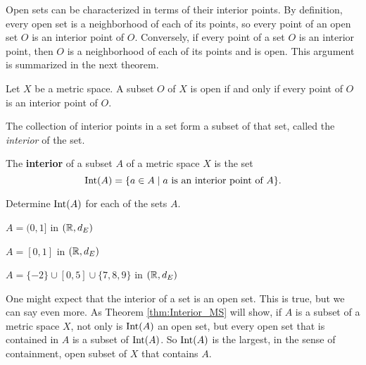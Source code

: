 
Open sets can be characterized in terms of their interior points. By definition, every open set is a neighborhood of each of its points, so every point of an open set $O$ is an interior point of $O$. Conversely, if every point of a set $O$ is an interior point, then $O$ is a neighborhood of each of its points and is open. This argument is summarized in the next theorem. 

\begin{theorem} Let $X$ be a metric space. A subset $O$ of $X$ is open if and only if every point of $O$ is an interior point of $O$. 
\end{theorem}

The collection of interior points in a set form a subset of that set, called the \emph{interior} of the set.

\begin{definition} The \textbf{interior} of a subset $A$ of a metric space $X$ is the set
\[\text{Int}(A) = \{a \in A \mid a \text{ is an interior point of } A\}.\]
\end{definition}

\begin{activity} Determine $\text{Int}(A)$ for each of the sets $A$.
\ba
\item $A = (0,1]$ in $(\mathbb{R}, d_E)$

\item $A = [0,1]$ in $(\mathbb{R}, d_E)$

\item $A = \{-2\} \cup [0,5] \cup \{7,8,9\}$ in $(\mathbb{R},d_E)$

\ea
\end{activity}

\begin{comment}

\ActivitySolution
\ba
\item The interior of $A$ is the set $(0,1)$. 

\item The interior of $A$ is the set $(0,1)$. 

\item There are no open ball containing $-2$, $7$, $8$, or $9$ that is entirely contained in $A$. So the interior of $A$ is the set $(0,5)$. 

\ea

\end{comment}

One might expect that the interior of a set is an open set. This is true, but we can say even more. As Theorem \ref{thm:Interior_MS} will show, if $A$ is a subset of a metric space $X$, not only is $\text{Int}(A)$ an open set, but every open set that is contained in $A$ is a subset of $\text{Int}(A)$. So $\text{Int}(A)$ is the largest, in the sense of containment, open subset of $X$ that contains $A$. 

